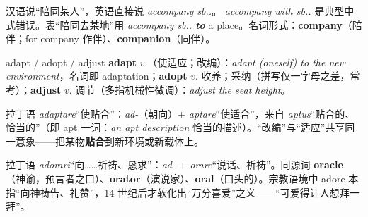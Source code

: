 \documentclass[../main.tex]{subfiles}
\begin{document}
\begin{gram}
汉语说“陪同某人”，英语直接说 \textit{accompany sb..}。\textcolor{WildStrawberry!80!black}{} \textit{accompany with sb..} 是典型中式错误。表“陪同去某地”用 \textit{accompany sb.. \textbf{to}} a place。名词形式：\textbf{company}（陪伴；for company 作伴）、\textbf{companion}（同伴）。
\end{gram}




\begin{lex}{adapt / adopt / adjust}
\textbf{adapt} $v.$（使适应；改编）：\textit{adapt (oneself) to the new environment}，名词即 adaptation；\textbf{adopt} $v.$ 收养；采纳（拼写仅一字母之差，常考）；\textbf{adjust} $v.$ 调节（多指机械性微调）：\textit{adjust the seat height}。
\end{lex}

\begin{origin}
拉丁语 \textit{adaptare}“使贴合”：\textit{ad-}（朝向）+ \textit{aptare}“使适合”，来自 \textit{aptus}“贴合的、恰当的”（即 apt 一词：\textit{an apt description} 恰当的描述）。“改编”与“适应”共享同一意象——把某物\textbf{贴合}到新环境或新载体上。
\end{origin}



\begin{origin}
拉丁语 \textit{adorari}“向……祈祷、恳求”：\textit{ad-} + \textit{orare}“说话、祈祷”。同源词 \textbf{oracle}（神谕，预言者之口）、\textbf{orator}（演说家）、\textbf{oral}（口头的）。宗教语境中 adore 本指“向神祷告、礼赞”，14 世纪后才软化出“万分喜爱”之义——“可爱得让人想拜一拜”。
\end{origin}


\end{document}
